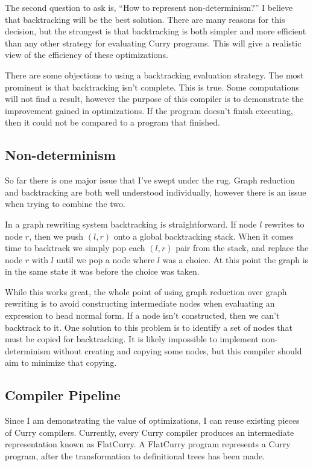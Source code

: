 The second question to ask is, ``How to represent non-determinism?''
I believe that backtracking will be the best solution.
There are many reasons for this decision, but the strongest is that backtracking
is both simpler and more efficient than any other strategy for evaluating Curry programs.
This will give a realistic view of the efficiency of these optimizations.

There are some objections to using a backtracking evaluation strategy.
The most prominent is that backtracking isn't complete.
This is true. Some computations will not find a result,
however the purpose of this compiler is to demonstrate the improvement gained in optimizations.
If the program doesn't finish executing, then it could not be compared to a program that finished.

\subsection{Non-determinism}

So far there is one major issue that I've swept under the rug.
Graph reduction and backtracking are both well understood individually,
however there is an issue when trying to combine the two.

In a graph rewriting system backtracking is straightforward.
If node $l$ rewrites to node $r$, then we push $(l,r)$ onto a global backtracking stack.
When it comes time to backtrack we simply pop each $(l,r)$ pair from the stack, and
replace the node $r$ with $l$ until we pop a node where $l$ was a choice.
At this point the graph is in the same state it was before the choice was taken.

While this works great, the whole point of using graph reduction over graph rewriting
is to avoid constructing intermediate nodes when evaluating an expression to head normal form.
If a node isn't constructed, then we can't backtrack to it.
One solution to this problem is to identify a set of nodes that must be copied for backtracking.
It is likely impossible to implement non-determinism without creating and copying some nodes,
but this compiler should aim to minimize that copying.

\subsection{Compiler Pipeline}
Since I am demonstrating the value of optimizations, I can reuse existing pieces of Curry compilers.
Currently, every Curry compiler produces an intermediate representation known as FlatCurry.
A FlatCurry program represents a Curry program,
after the transformation to definitional trees has been made.

